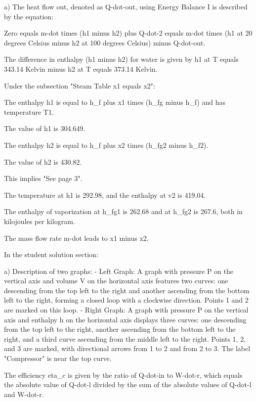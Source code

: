 a) The heat flow out, denoted as Q-dot-out, using Energy Balance I is described by the equation:

Zero equals m-dot times (h1 minus h2) plus Q-dot-2 equals m-dot times (h1 at 20 degrees Celsius minus h2 at 100 degrees Celsius) minus Q-dot-out.

The difference in enthalpy (h1 minus h2) for water is given by h1 at T equals 343.14 Kelvin minus h2 at T equals 373.14 Kelvin.

Under the subsection "Steam Table x1 equals x2":

The enthalpy h1 is equal to h_f plus x1 times (h_fg minus h_f) and has temperature T1.

The value of h1 is 304.649.

The enthalpy h2 is equal to h_f plus x2 times (h_fg2 minus h_f2).

The value of h2 is 430.82.

This implies "See page 3".

The temperature at h1 is 292.98, and the enthalpy at v2 is 419.04.

The enthalpy of vaporization at h_fg1 is 262.68 and at h_fg2 is 267.6, both in kilojoules per kilogram.

The mass flow rate m-dot leads to x1 minus x2.

In the student solution section:

a) Description of two graphs:
- Left Graph: A graph with pressure P on the vertical axis and volume V on the horizontal axis features two curves: one descending from the top left to the right and another ascending from the bottom left to the right, forming a closed loop with a clockwise direction. Points 1 and 2 are marked on this loop.
- Right Graph: A graph with pressure P on the vertical axis and enthalpy h on the horizontal axis displays three curves: one descending from the top left to the right, another ascending from the bottom left to the right, and a third curve ascending from the middle left to the right. Points 1, 2, and 3 are marked, with directional arrows from 1 to 2 and from 2 to 3. The label "Compressor" is near the top curve.

The efficiency eta_c is given by the ratio of Q-dot-in to W-dot-r, which equals the absolute value of Q-dot-l divided by the sum of the absolute values of Q-dot-l and W-dot-r.